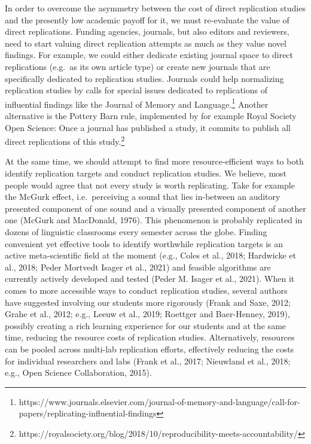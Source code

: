\documentclass[]{elsarticle} %
\begin{document}
In order to overcome the asymmetry between the cost of direct replication studies and the presently low academic payoff for it, we must re-evaluate the value of direct replications. Funding agencies, journals, but also editors and reviewers, need to start valuing direct replication attempts as much as they value novel findings. For example, we could either dedicate existing journal space to direct replications (e.g.~as its own article type) or create new journals that are specifically dedicated to replication studies.
Journals could help normalizing replication studies by calls for special issues dedicated to replications of influential findings like the Journal of Memory and Language.\footnote{https://www.journals.elsevier.com/journal-of-memory-and-language/call-for-papers/replicating-influential-findings}
Another alternative is the Pottery Barn rule, implemented by for example Royal Society Open Science: Once a journal has published a study, it commits to publish all direct replications of this study.\footnote{ https://royalsociety.org/blog/2018/10/reproducibility-meets-accountability/}

At the same time, we should attempt to find more resource-efficient ways to both identify replication targets and conduct replication studies. We believe, most people would agree that not every study is worth replicating. Take for example the McGurk effect, i.e.~perceiving a sound that lies in-between an auditory presented component of one sound and a visually presented component of another one (McGurk and MacDonald, 1976). This phenomenon is probably replicated in dozens of linguistic classrooms every semester across the globe. Finding convenient yet effective tools to identify worthwhile replication targets is an active meta-scientific field at the moment (e.g., Coles et al., 2018; Hardwicke et al., 2018; Peder Mortvedt Isager et al., 2021) and feasible algorithms are currently actively developed and tested (Peder M. Isager et al., 2021).
When it comes to more accessible ways to conduct replication studies, several authors have suggested involving our students more rigorously (Frank and Saxe, 2012; Grahe et al., 2012; e.g., Leeuw et al., 2019; Roettger and Baer-Henney, 2019), possibly creating a rich learning experience for our students and at the same time, reducing the resource costs of replication studies. Alternatively, resources can be pooled across multi-lab replication efforts, effectively reducing the costs for individual researchers and labs (Frank et al., 2017; Nieuwland et al., 2018; e.g., Open Science Collaboration, 2015).
\end{document}
